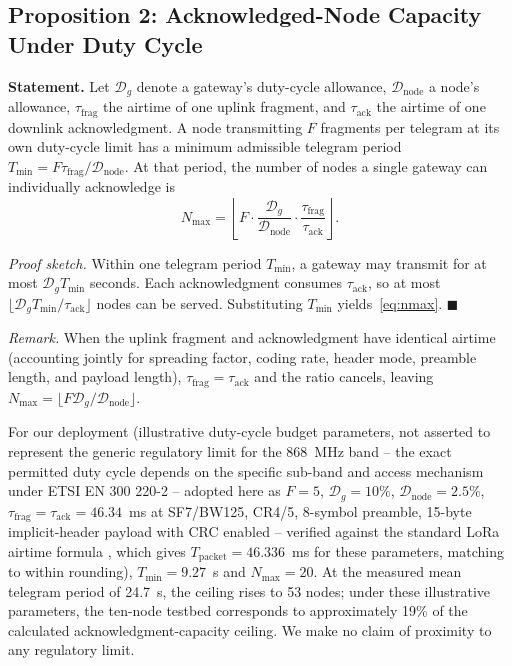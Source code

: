\documentclass[journal]{IEEEtran}
\begin{document}
\subsection{Proposition 2: Acknowledged-Node Capacity Under Duty Cycle}
\label{prop:capacity}
\textbf{Statement.} Let $\mathcal{D}_g$ denote a gateway's duty-cycle allowance, $\mathcal{D}_{\text{node}}$ a node's allowance, $\tau_{\text{frag}}$ the airtime of one uplink fragment, and $\tau_{\text{ack}}$ the airtime of one downlink acknowledgment. A node transmitting $F$ fragments per telegram at its own duty-cycle limit has a minimum admissible telegram period $T_{\min} = F\tau_{\text{frag}}/\mathcal{D}_{\text{node}}$. At that period, the number of nodes a single gateway can individually acknowledge is
\begin{equation}
N_{\max} = \left\lfloor F \cdot \frac{\mathcal{D}_g}{\mathcal{D}_{\text{node}}} \cdot \frac{\tau_{\text{frag}}}{\tau_{\text{ack}}} \right\rfloor .
\label{eq:nmax}
\end{equation}

\textit{Proof sketch.} Within one telegram period $T_{\min}$, a gateway may transmit for at most $\mathcal{D}_g T_{\min}$ seconds. Each acknowledgment consumes $\tau_{\text{ack}}$, so at most $\lfloor \mathcal{D}_g T_{\min}/\tau_{\text{ack}} \rfloor$ nodes can be served. Substituting $T_{\min}$ yields~\eqref{eq:nmax}. \hfill$\blacksquare$

\textit{Remark.} When the uplink fragment and acknowledgment have identical airtime (accounting jointly for spreading factor, coding rate, header mode, preamble length, and payload length), $\tau_{\text{frag}} = \tau_{\text{ack}}$ and the ratio cancels, leaving $N_{\max} = \lfloor F \mathcal{D}_g / \mathcal{D}_{\text{node}} \rfloor$.

For our deployment (illustrative duty-cycle budget parameters, not asserted to represent the generic regulatory limit for the 868~MHz band -- the exact permitted duty cycle depends on the specific sub-band and access mechanism under ETSI EN 300 220-2 \cite{etsi_en300220_2} -- adopted here as $F=5$, $\mathcal{D}_g=10\%$, $\mathcal{D}_{\text{node}}=2.5\%$, $\tau_{\text{frag}}=\tau_{\text{ack}}=46.34$~ms at SF7/BW125, CR4/5, 8-symbol preamble, 15-byte implicit-header payload with CRC enabled -- verified against the standard LoRa airtime formula \cite{semtech_an1200_13}, which gives $T_{\text{packet}} = 46.336$~ms for these parameters, matching to within rounding), $T_{\min} = 9.27$~s and $N_{\max} = 20$. At the measured mean telegram period of 24.7~s, the ceiling rises to 53 nodes; under these illustrative parameters, the ten-node testbed corresponds to approximately 19\% of the calculated acknowledgment-capacity ceiling. We make no claim of proximity to any regulatory limit.
\end{document}
